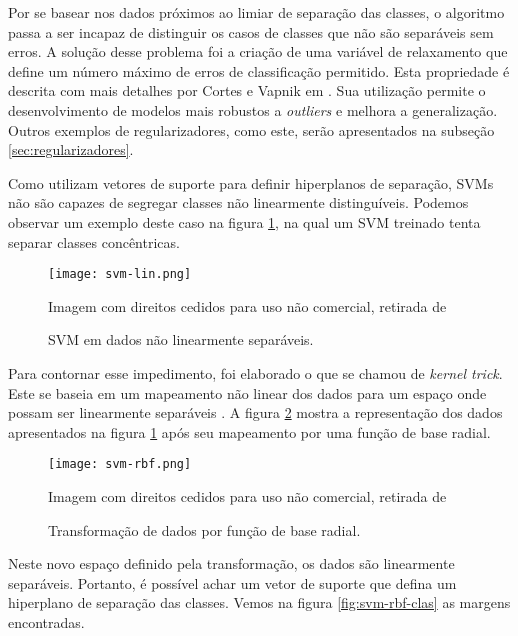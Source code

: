 Por se basear nos dados próximos ao limiar de separação das classes, o algoritmo passa a ser incapaz de distinguir os casos de classes que não são separáveis sem erros. A solução desse problema foi a criação de uma variável de relaxamento que define um número máximo de erros de classificação permitido. Esta propriedade é descrita com mais detalhes por Cortes e Vapnik em \cite{cortes95}. Sua utilização permite o desenvolvimento de modelos mais robustos a \textit{outliers} e melhora a generalização. Outros exemplos de regularizadores, como este, serão apresentados na subseção \ref{sec:regularizadores}.

Como utilizam vetores de suporte para definir hiperplanos de separação, SVMs não são capazes de segregar classes não linearmente distinguíveis. Podemos observar um exemplo deste caso na figura \ref{fig:svm-lin}, na qual um SVM treinado tenta separar classes concêntricas.

\begin{figure}
\begin{center} {
    \begin{center}
    \texttt{[image: svm-lin.png]}
    \caption{SVM em dados não linearmente separáveis.}
    \small Imagem com direitos cedidos para uso não comercial, retirada de \cite{vanderplas15}
    \label{fig:svm-lin}
    \end{center}
}
\end{center}
\end{figure}

Para contornar esse impedimento, foi elaborado o que se chamou de \textit{kernel trick}. Este se baseia em um mapeamento não linear dos dados para um espaço onde possam ser linearmente separáveis \cite{scholkopf02}. A figura \ref{fig:svm-rbf} mostra a representação dos dados apresentados na figura \ref{fig:svm-lin} após seu mapeamento por uma função de base radial.

\begin{figure}
\begin{center} {
    \begin{center}
    \texttt{[image: svm-rbf.png]}
    \caption{Transformação de dados por função de base radial.}
    \small Imagem com direitos cedidos para uso não comercial, retirada de \cite{vanderplas15}
    \label{fig:svm-rbf}
    \end{center}
}
\end{center}
\end{figure}

Neste novo espaço definido pela transformação, os dados são linearmente separáveis. Portanto, é possível achar um vetor de suporte que defina um hiperplano de separação das classes. Vemos na figura \ref{fig:svm-rbf-clas} as margens encontradas.

